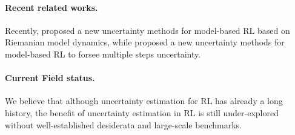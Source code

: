 \paragraph{Recent related works.} Recently, \cite{tennenholtz2022plan} proposed a new uncertainty methods for model-based RL based on Riemanian model dynamics, while \cite{wu2022plan} proposed a new uncertainty methods for model-based RL to forsee multiple steps uncertainty.

\paragraph{Current Field status.} We believe that although uncertainty estimation for RL has already a long history, the benefit of uncertainty estimation in RL is still under-explored without well-established desiderata and large-scale benchmarks.